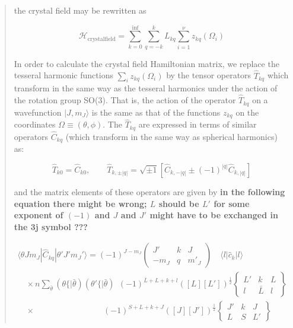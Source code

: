 \begin{quotation}
the crystal field may be rewritten as

\begin{equation}
\mathcal H_{\mathrm{crystalfield}}=  \sum_{k=0}^{\inf} \sum_{q=-k}^k  L_{kq} \sum_{i=1}^\nu z_{kq}(\Omega_i)
\end{equation}

In order to calculate the crystal field Hamiltonian matrix, we replace the tesseral harmonic
functions $\sum_i z_{kq}(\Omega_i)$ by the tensor operators $\hat{T}_{kq}$ which transform in the
same way as the tesseral harmonics under the action of the rotation group SO(3). That is, the action
of the operator $\hat{T}_{kq}$ on a wavefunction $|J,m_J\rangle$ is the same as that of the
functions $z_{kq}$ on the coordinates $\Omega \equiv (\theta,\phi)$. The $\hat{T}_{kq}$ are
expressed in terms of similar operators $\hat{C}_{kq}$ (which transform in the same way as spherical
harmonics) as:

\begin{equation} \label{tkqhermitian}
  \hat{T}_{k0} = \hat{C}_{k0}, \qquad \hat{T}_{k,\pm|q|} = \sqrt{\pm 1} \left[
  \hat{C}_{k,-|q|} \pm (-1)^{|q|} \hat{C}_{k,|q|} \right]
\end{equation}

\noindent and the matrix elements of these operators are given by {\bf 
in the following equation there might be wrong; $L$ should be $L'$ 
for some exponent of $(-1)$ and $J$ and $J'$ might have
to be exchanged in the 3j symbol ???}

\begin{equation} \label{iccfmatel}
\begin{array}{l}
\langle \theta J m_J | \hat{C}_{kq} | \theta' J' m_J' \rangle = (-1)^{J-m_J}
       \left( \begin{array}{ccc} J' & k & J \\ -m_J & q & m'_J \end{array} \right)
       \quad \langle l | \hat{c}_k | l \rangle  \\
 \quad \times n \sum_{\bar{\theta}} (\theta\{|\bar{\theta}) (\theta'\{|\bar{\theta})
       \ \  (-1)^{\bar{L}+L+k+l} ([L][L'])^{\frac{1}{2}}
       \left\{ \begin{array}{ccc} L' & k & L \\ l & \bar{L} & l \end{array} \right\}  \\
 \quad \times \qquad\qquad\qquad\qquad\  (-1)^{S+L+k+J} ([J][J'])^{\frac{1}{2}}
       \left\{ \begin{array}{ccc} J' & k & J \\ L & S & L' \end{array} \right\}
\end{array}
\end{equation}


\end{quotation}
